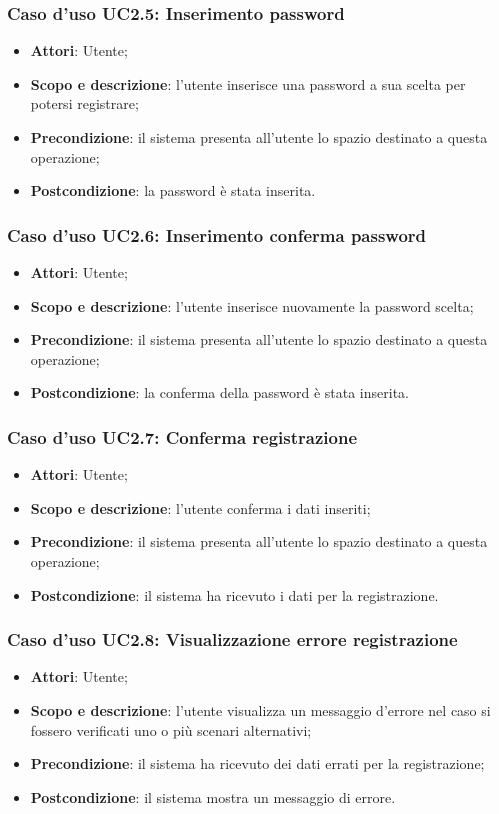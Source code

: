 \subsubsection{Caso d'uso UC2.5: Inserimento password}
\begin{itemize}
\item \textbf{Attori}: Utente;
\item \textbf{Scopo e descrizione}: l'utente inserisce una password a sua scelta per potersi registrare;
\item \textbf{Precondizione}: il sistema presenta all'utente lo spazio destinato a questa operazione;
\item \textbf{Postcondizione}: la password è stata inserita.
\end{itemize}

\subsubsection{Caso d'uso UC2.6: Inserimento conferma password}
\begin{itemize}
\item \textbf{Attori}: Utente;
\item \textbf{Scopo e descrizione}: l'utente inserisce nuovamente la password scelta;
\item \textbf{Precondizione}: il sistema presenta all'utente lo spazio destinato a questa operazione;
\item \textbf{Postcondizione}: la conferma della password è stata inserita.
\end{itemize}

\subsubsection{Caso d'uso UC2.7: Conferma registrazione}
\begin{itemize}
\item \textbf{Attori}: Utente;
\item \textbf{Scopo e descrizione}: l'utente conferma i dati inseriti;
\item \textbf{Precondizione}: il sistema presenta all'utente lo spazio destinato a questa operazione;
\item \textbf{Postcondizione}: il sistema ha ricevuto i dati per la registrazione.
\end{itemize}

\subsubsection{Caso d'uso UC2.8: Visualizzazione errore registrazione}
\begin{itemize}
\item \textbf{Attori}: Utente;
\item \textbf{Scopo e descrizione}: l'utente visualizza un messaggio d'errore nel caso si fossero verificati uno o più scenari alternativi;
\item \textbf{Precondizione}: il sistema ha ricevuto dei dati errati per la registrazione;
\item \textbf{Postcondizione}: il sistema mostra un messaggio di errore.
\end{itemize}
